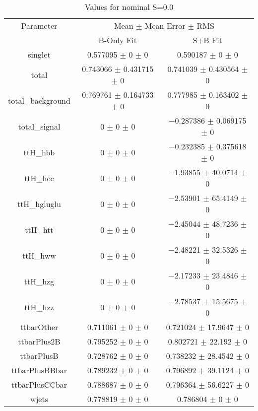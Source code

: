 \begin{table}
\centering
\caption{Values for nominal S=0.0}
\begin{tabular}{ccc}
\toprule
Parameter & \multicolumn{2}{c}{Mean $\pm$ Mean Error $\pm$ RMS}\\
 & B-Only Fit & S+B Fit\\
\midrule
singlet & \num{0.577095} $\pm$ \num{0} $\pm$ \num{0} & \num{0.590187} $\pm$ \num{0} $\pm$ \num{0}\\
total & \num{0.743066} $\pm$ \num{0.431715} $\pm$ \num{0} & \num{0.741039} $\pm$ \num{0.430564} $\pm$ \num{0}\\
total\_background & \num{0.769761} $\pm$ \num{0.164733} $\pm$ \num{0} & \num{0.777985} $\pm$ \num{0.163402} $\pm$ \num{0}\\
total\_signal & \num{0} $\pm$ \num{0} $\pm$ \num{0} & \num{-0.287386} $\pm$ \num{0.069175} $\pm$ \num{0}\\
ttH\_hbb & \num{0} $\pm$ \num{0} $\pm$ \num{0} & \num{-0.232385} $\pm$ \num{0.375618} $\pm$ \num{0}\\
ttH\_hcc & \num{0} $\pm$ \num{0} $\pm$ \num{0} & \num{-1.93855} $\pm$ \num{40.0714} $\pm$ \num{0}\\
ttH\_hgluglu & \num{0} $\pm$ \num{0} $\pm$ \num{0} & \num{-2.53901} $\pm$ \num{65.4149} $\pm$ \num{0}\\
ttH\_htt & \num{0} $\pm$ \num{0} $\pm$ \num{0} & \num{-2.45044} $\pm$ \num{48.7236} $\pm$ \num{0}\\
ttH\_hww & \num{0} $\pm$ \num{0} $\pm$ \num{0} & \num{-2.48221} $\pm$ \num{32.5326} $\pm$ \num{0}\\
ttH\_hzg & \num{0} $\pm$ \num{0} $\pm$ \num{0} & \num{-2.17233} $\pm$ \num{23.4846} $\pm$ \num{0}\\
ttH\_hzz & \num{0} $\pm$ \num{0} $\pm$ \num{0} & \num{-2.78537} $\pm$ \num{15.5675} $\pm$ \num{0}\\
ttbarOther & \num{0.711061} $\pm$ \num{0} $\pm$ \num{0} & \num{0.721024} $\pm$ \num{17.9647} $\pm$ \num{0}\\
ttbarPlus2B & \num{0.795252} $\pm$ \num{0} $\pm$ \num{0} & \num{0.802721} $\pm$ \num{22.192} $\pm$ \num{0}\\
ttbarPlusB & \num{0.728762} $\pm$ \num{0} $\pm$ \num{0} & \num{0.738232} $\pm$ \num{28.4542} $\pm$ \num{0}\\
ttbarPlusBBbar & \num{0.789232} $\pm$ \num{0} $\pm$ \num{0} & \num{0.796892} $\pm$ \num{39.1124} $\pm$ \num{0}\\
ttbarPlusCCbar & \num{0.788687} $\pm$ \num{0} $\pm$ \num{0} & \num{0.796364} $\pm$ \num{56.6227} $\pm$ \num{0}\\
wjets & \num{0.778819} $\pm$ \num{0} $\pm$ \num{0} & \num{0.786804} $\pm$ \num{0} $\pm$ \num{0}\\
\bottomrule
\end{tabular}
\end{table}